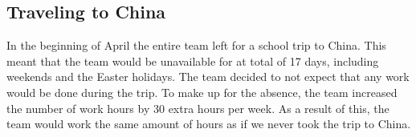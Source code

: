 \subsection{Traveling to China}
In the beginning of April the entire team left for a school trip to China. This meant that the team would be unavailable for at total of 17 days, including weekends and the Easter holidays. The team decided to not expect that any work would be done during the trip. To make up for the absence, the team increased the number of work hours by 30 extra hours per week. As a result of this, the team would work the same amount of hours as if we never took the trip to China.





